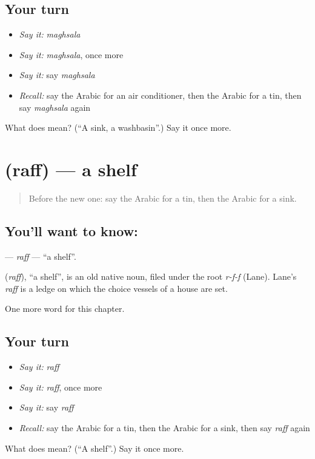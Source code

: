 \subsection*{Your turn}
\begin{itemize}
\raggedright
  \item \emph{Say it:} \emph{maghsala}
  \item \emph{Say it:} \emph{maghsala}, once more
  \item \emph{Say it:} say \emph{maghsala}
  \item \emph{Recall:} say the Arabic for an air conditioner, then the Arabic for a tin, then say \emph{maghsala} again
\end{itemize}

\begin{tcolorbox}[breakable,colback=teal!4,colframe=teal!35!black,title={Before you move on}]
What does  mean? (\textquotedblleft{}A sink, a washbasin\textquotedblright{}.) Say it once more.
\end{tcolorbox}
\section[\texorpdfstring{\ar{رف} (raff)}{رف (raff)}]{ (raff) — a shelf}

\label{lesson:AR-C181-raff}



\begin{quote}
Before the new one: say the Arabic for a tin, then the Arabic for a sink.
\end{quote}

\subsection*{You'll want to know: }
\textbf{} — \emph{raff} — \textquotedblleft{}a shelf\textquotedblright{}.

\begin{cousinweb}
\textbf{} (\emph{raff}), \textquotedblleft{}a shelf\textquotedblright{}, is an old native noun, filed under the root \emph{r-f-f} (Lane). Lane's \emph{raff} is a ledge on which the choice vessels of a house are set.
\end{cousinweb}

\begin{grammarlens}[title={What you've built}]
One more word for this chapter.
\end{grammarlens}

\subsection*{Your turn}
\begin{itemize}
\raggedright
  \item \emph{Say it:} \emph{raff}
  \item \emph{Say it:} \emph{raff}, once more
  \item \emph{Say it:} say \emph{raff}
  \item \emph{Recall:} say the Arabic for a tin, then the Arabic for a sink, then say \emph{raff} again
\end{itemize}

\begin{tcolorbox}[breakable,colback=teal!4,colframe=teal!35!black,title={Before you move on}]
What does  mean? (\textquotedblleft{}A shelf\textquotedblright{}.) Say it once more.
\end{tcolorbox}
